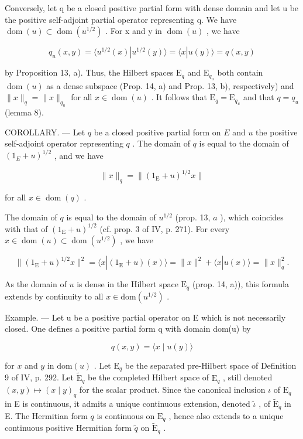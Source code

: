 Conversely, let q be a closed positive partial form with dense domain and let u be the positive self-adjoint partial operator representing q. We have \(\operatorname{dom}(u) \subset \operatorname{dom}(u^{1/2})\) . For x and y in \(\operatorname{dom}(u)\) , we have

\[
q _ {u} (x, y) = \langle u ^ {1 / 2} (x) | u ^ {1 / 2} (y) \rangle = \langle x | u (y) \rangle = q (x, y)
\]

by Proposition 13, a). Thus, the Hilbert spaces \(\mathrm{E}_q\) and \(\mathrm{E}_{q_u}\) both contain \(\operatorname{dom}(u)\) as a dense subspace (Prop. 14, a) and Prop. 13, b), respectively) and \(\|x\|_q = \|x\|_{q_u}\) for all \(x \in \operatorname{dom}(u)\) . It follows that \(\mathrm{E}_q = \mathrm{E}_{q_u}\) and that \(q = q_u\) (lemma 8).

COROLLARY. --- Let \(q\) be a closed positive partial form on \(E\) and \(u\) the positive self-adjoint operator representing \(q\) . The domain of \(q\) is equal to the domain of \((1_{E} + u)^{1/2}\) , and we have

\[
\| x \| _ {q} = \| (1 _ {\mathrm{E}} + u) ^ {1 / 2} x \|
\]

for all \(x \in \operatorname{dom}(q)\) .

The domain of \(q\) is equal to the domain of \(u^{1/2}\) (prop. 13, \(a\) ), which coincides with that of \((1_{\mathrm{E}} + u)^{1/2}\) (cf. prop. 3 of IV, p. 271). For every \(x \in \operatorname{dom}(u) \subset \operatorname{dom}(u^{1/2})\) , we have

\[
\| (1 _ {\mathrm{E}} + u) ^ {1 / 2} x \| ^ {2} = \langle x | (1 _ {\mathrm{E}} + u) (x) \rangle = \| x \| ^ {2} + \langle x | u (x) \rangle = \| x \| _ {q} ^ {2}.
\]

As the domain of \(u\) is dense in the Hilbert space \(\mathrm{E}_q\) (prop. 14, a)), this formula extends by continuity to all \(x \in \mathrm{dom}(u^{1/2})\) .

Example. --- Let u be a positive partial operator on E which is not necessarily closed. One defines a positive partial form q with domain dom(u) by

\[
q (x, y) = \langle x \mid u (y) \rangle
\]

for \(x\) and \(y\) in \(\mathrm{dom}(u)\) . Let \(\mathrm{E}_q\) be the separated pre-Hilbert space of Definition 9 of IV, p. 292. Let \(\widetilde{\mathrm{E}}_q\) be the completed Hilbert space of \(\mathrm{E}_q\) , still denoted \((x,y) \mapsto (x \mid y)_q\) for the scalar product. Since the canonical inclusion \(\iota\) of \(\mathrm{E}_q\) in E is continuous, it admits a unique continuous extension, denoted \(\widetilde{\iota}\) , of \(\widetilde{\mathrm{E}}_q\) in E. The Hermitian form \(q\) is continuous on \(\mathrm{E}_q\) , hence also extends to a unique continuous positive Hermitian form \(\widetilde{q}\) on \(\widetilde{\mathrm{E}}_q\) .

